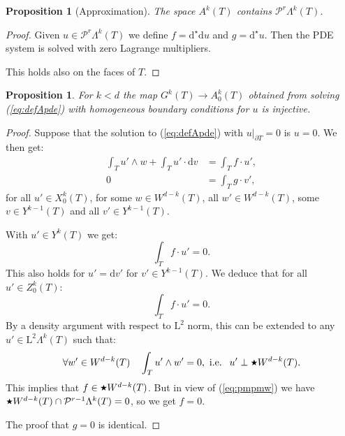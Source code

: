 \documentclass[10pt,a4paper]{article}
\newcommand{\rmd}{\mathrm{d}}
\newcommand{\rmL}{\mathrm{L}}
\newcommand{\calP}{\mathcal{P}}
\newcommand{\hs}{\raisebox{1pt}{$\scriptstyle \bigstar$}}
\newcommand{\Poly}{\calP}
\newtheorem{proposition}[theorem]{Proposition}
\theoremstyle{remark}
\theoremstyle{definition}
\numberwithin{equation}{section}
\begin{document}
 \begin{proposition}[Approximation]
The space $ A^k(T)$ contains $\Poly^r \Lambda^k(T)$.
 \end{proposition}
 \begin{proof}
   Given $u \in \Poly^r \Lambda^k(T)$ we define $f = \rmd^\star \rmd u$ and $g = \rmd^\star u$.
   Then the PDE system is solved with zero Lagrange multipliers.

   This holds also on the faces of $T$.
 \end{proof}
 

 
 \begin{proposition}
For $k < d$ the map $G^k(T) \to A^k_0(T)$ obtained from solving (\ref{eq:defApde}) with homogeneous boundary conditions for $u$ is injective.
 \end{proposition}

 \begin{proof}
   Suppose that the solution to (\ref{eq:defApde}) with $u|_{\partial T} = 0$ is $u = 0$. We then get:
    \begin{align}
  \int_T u' \wedge w + \int_T u' \cdot \rmd v & = \int_T f \cdot u',\\
  0 & = \int_T g \cdot v',
\end{align} 
for all $u' \in X^k_0(T)$, for some $w\in W^{d-k}(T)$, all $w'\in W^{d-k}(T)$, some $v \in Y^{k-1}(T)$ and all $v' \in Y^{k-1}(T)$.

With $u' \in Y^k(T)$ we get:
\begin{equation}
  \int_T f \cdot u' =0.
\end{equation}
This also holds for $u' = \rmd v'$ for $v' \in Y^{k-1}(T)$. We deduce that for all $u' \in Z^k_0(T)$:
\begin{equation}
  \int_T f \cdot u' =0.
\end{equation}
By a density argument with respect to $\rmL^2$ norm, this can be extended to any $u' \in \rmL^2 \Lambda^k(T)$ such that:
\begin{equation}
\forall w' \in W^{d-k}(T) \quad  \int_T u' \wedge w' = 0, \textrm{ i.e. }\ u' \perp \hs W^{d-k}(T).
\end{equation}
This implies that $f \in \hs W^{d-k}(T)$.  But in view of (\ref{eq:pmpmw}) we have $\hs W^{d-k}(T) \cap \Poly^{r-1} \Lambda^k(T) = 0$, so we get $f =0$. 

The proof that $g = 0$ is identical.
 \end{proof}
 
\end{document}
